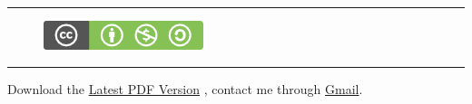 \documentclass[letterpaper,10pt,english]{sphinxmanual}
\begin{document}
\bigskip\hrule{}\bigskip

\begin{figure}[htbp]
\centering
\href{http://creativecommons.org/licenses/by-nc-sa/3.0/us/}{\includegraphics{cc_byncsa.png}}\end{figure}


\bigskip\hrule{}\bigskip


Download the \href{https://github.com/bczhu/phyx/raw/master/\_build/latex/Physics.pdf}{Latest PDF Version} , contact me through \href{mailto:bczhu1990@gmail.com}{Gmail}.



\renewcommand{\indexname}{Index}
\printindex
\end{document}
